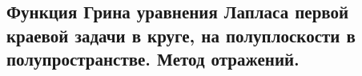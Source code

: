 \subsection{Функция Грина уравнения Лапласа первой краевой задачи в круге, на полуплоскости в полупространстве. Метод отражений.}